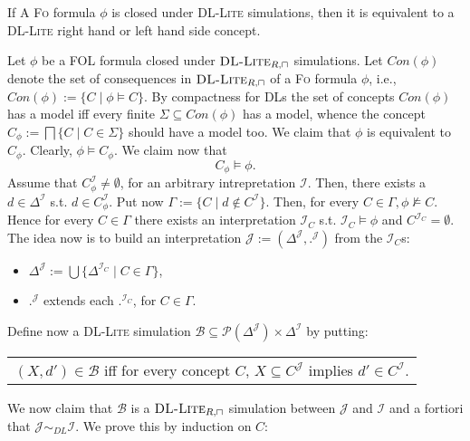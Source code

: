 \documentclass[11pt]{llncs}
\newcommand{\logic}[1]{\textsc{#1}\xspace}
\newcommand{\FOL}{\logic{Fo}}
\newcommand{\g}[1]{\logic{#1}}
\newcommand{\inte}{\f{I}}
\newcommand{\tup}[1]{(#1)}
\newcommand{\set}[1]{\{#1\}}
\newcommand{\f}[1]{\mathcal{#1}}
\newcommand{\dlliterc}{\g{DL-Lite}_{R,\sqcap}\xspace}
\begin{document}
\begin{lemma}
If A \FOL formula $\phi$ is closed
under \g{DL-Lite} simulations, then it is 
equivalent to a \g{DL-Lite}
right hand or left hand side concept.
\end{lemma}

\proof Let $\phi$ be a \g{FOL} formula closed under
$\dlliterc$ simulations. Let $\textit{Con}(\phi)$ denote the set of consequences in 
$\dlliterc$ of 
a \FOL formula $\phi$, i.e., $\textit{Con}(\phi) := \set{C \mid \phi \models C}$. 
By compactness for DLs \cite{DLHandbook} the set of concepts
$\textit{Con}(\phi)$ has a model iff every finite $\Sigma \subseteq \textit{Con}(\phi)$ 
has a model, whence
the concept $C_{\phi} := 
\bigsqcap \set{C \mid C \in \Sigma}$ should have a model too.
We claim that $\phi$ is equivalent to $C_{\phi}$. Clearly,
$\phi \models C_{\phi}$. We claim now that
\begin{equation}\label{eq:e}
C_{\phi} \models \phi.
\end{equation}
Assume that $C^{\inte}_{\phi} \neq \emptyset$, 
for an arbitrary intrepretation $\f{I}$.
Then, there exists a
$d \in \Delta^{\f{I}}$ s.t. $d \in C^{\inte}_{\phi}$.
Put now $\Gamma := \set{C \mid d \not\in 
C^{\f{I}}}$. Then, for every $C \in \Gamma, \phi \not\models C$. 
Hence for every $C \in \Gamma$
there exists an interpretation ${\f{I}}_C$ 
s.t. ${\f{I}}_C \models \phi$ and $C^{{\f{I}}_C}=\emptyset$.
The idea now is to build an interpretation $\f{J} := \tup{\Delta^{\f{J}},
.^{\f{J}}}$ from the
$\inte_C$s:
\begin{itemize}
\item $\Delta^{\f{J}} := \bigcup \set{\Delta^{\f{I}_C} \mid C \in \Gamma}$,
\item $.^{\f{J}}$ extends each $.^{\f{I}_C}$, for $C \in \Gamma$.
\end{itemize}
Define now a \g{DL-Lite} simulation $\f{B} \subseteq \f{P}(\Delta^{\f{J}}) \times \Delta^{\f{I}}$ by putting:
\begin{center}
\begin{tabular}{c}
$\tup{X,d'} \in \f{B}$ iff for every concept $C$, $X \subseteq C^{\f{J}}$ implies $d' \in C^{\f{I}}$.
\end{tabular}
\end{center}
We now claim that $\f{B}$ is a $\dlliterc$ simulation
between $\f{J}$ and $\f{I}$ and a fortiori that
$\f{J} \sim_{DL} \f{I}$.
We prove this by induction on $C$:
\end{document}
